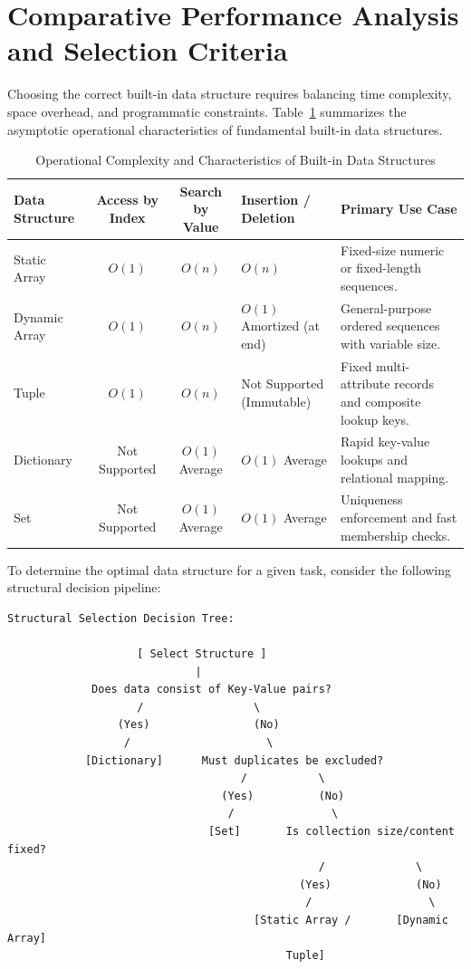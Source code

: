 \documentclass[12pt]{report}
\begin{document}
\section{Comparative Performance Analysis and Selection Criteria}

Choosing the correct built-in data structure requires balancing time complexity, space overhead, and programmatic constraints. Table~\ref{tab:builtin_comparison} summarizes the asymptotic operational characteristics of fundamental built-in data structures.

\begin{table}[htbp]
\centering
\caption{Operational Complexity and Characteristics of Built-in Data Structures}
\label{tab:builtin_comparison}
\begin{tabularx}{\textwidth}{@{} l c c >{\raggedright\arraybackslash}p{2.5cm} X @{}}
\toprule
\textbf{Data Structure} & \textbf{Access by Index} & \textbf{Search by Value} & \textbf{Insertion / Deletion} & \textbf{Primary Use Case} \\
\midrule
Static Array & $O(1)$ & $O(n)$ & $O(n)$ & Fixed-size numeric or fixed-length sequences. \\
Dynamic Array & $O(1)$ & $O(n)$ & $O(1)$ Amortized (at end) & General-purpose ordered sequences with variable size. \\
Tuple & $O(1)$ & $O(n)$ & Not Supported (Immutable) & Fixed multi-attribute records and composite lookup keys. \\
Dictionary & Not Supported & $O(1)$ Average & $O(1)$ Average & Rapid key-value lookups and relational mapping. \\
Set & Not Supported & $O(1)$ Average & $O(1)$ Average & Uniqueness enforcement and fast membership checks. \\
\bottomrule
\end{tabularx}
\end{table}

To determine the optimal data structure for a given task, consider the following structural decision pipeline:

\begin{verbatim}
Structural Selection Decision Tree:

                    [ Select Structure ]
                             |
             Does data consist of Key-Value pairs?
                    /                 \
                 (Yes)                (No)
                  /                     \
            [Dictionary]      Must duplicates be excluded?
                                    /           \
                                 (Yes)          (No)
                                  /               \
                               [Set]       Is collection size/content fixed?
                                                /              \
                                             (Yes)             (No)
                                              /                  \
                                      [Static Array /       [Dynamic Array]
                                           Tuple]
\end{verbatim}
\end{document}
